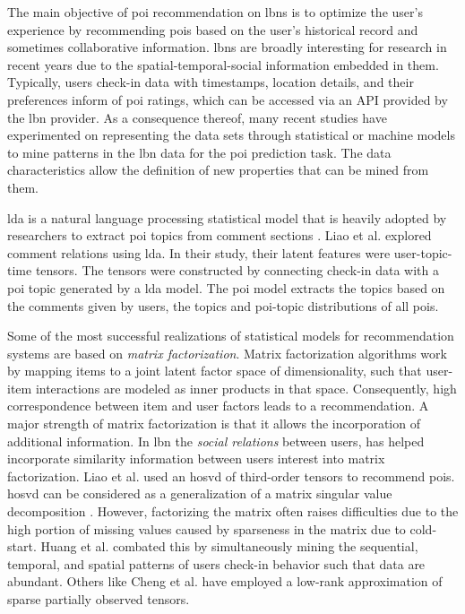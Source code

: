 The main objective of \gls{poi} recommendation on \glspl{lbn} is to optimize the user's experience by recommending \glspl{poi} based on the user's historical record and sometimes collaborative information. \Glspl{lbn} are broadly interesting for research in recent years due to the spatial-temporal-social information embedded in them\parencite{Cheng2011ExploringServices}. Typically, users check-in data with timestamps, location details, and their preferences inform of \gls{poi} ratings, which can be accessed via an API provided by the \gls{lbn} provider. As a consequence thereof, many recent studies have experimented on representing the data sets through statistical or machine models to mine patterns in the \gls{lbn} data for the \gls{poi} prediction task. The data characteristics allow the definition of new properties that can be mined from them.

\Gls{lda} is a natural language processing statistical model that is heavily adopted by researchers to extract \gls{poi} topics from comment sections \parencite{Liao2018POIFactorization, Huang2020Multi-modalNetworks}. Liao et al.\parencite{Liao2018POIFactorization} explored comment relations using \gls{lda}. In their study, their latent features were user-topic-time \glspl{tensor}. The \glspl{tensor} were constructed by connecting check-in data with a \gls{poi} topic generated by a \gls{lda} model. The \gls{poi} model extracts the topics based on the comments given by users, the topics and \gls{poi}-topic distributions of all \glspl{poi}. 

Some of the most successful realizations of statistical models for recommendation systems are based on \textit{matrix factorization}\parencite{Cheng2013WhereRecommendation, Cheng2012FusedNetworks, Chen2018PrivacyFactorization, Gao2013ExploringNetworks, Lian2015Content-AwareData}. Matrix factorization\parencite{Koren2009MatrixSystems} algorithms work by mapping items to a joint latent factor space of dimensionality, such that user-item interactions are modeled as inner products in that space. Consequently, high correspondence between item and user factors leads to a recommendation. A major strength of matrix factorization is that it allows the incorporation of additional information. In \gls{lbn} the \textit{social relations} between users, has helped incorporate similarity information between users interest into matrix factorization\parencite{Cheng2013WhereRecommendation, Liao2018POIFactorization, Huang2020Multi-modalNetworks}. Liao et al.\parencite{Liao2018POIFactorization} used an \gls{hosvd} of third-order \glspl{tensor} to recommend \glspl{poi}. \Gls{hosvd} can be considered as a generalization of a matrix singular value decomposition \parencite{Vandewalle1990SingularProcessing}. However, factorizing the matrix often raises difficulties due to the high portion of missing values caused by sparseness in the matrix due to cold-start. Huang et al.\parencite{Huang2020Multi-modalNetworks} combated this by simultaneously mining the sequential, temporal, and spatial patterns of users check-in behavior such that data are abundant. Others like Cheng et al.\parencite{Cheng2013WhereRecommendation} have employed a low-rank approximation of sparse partially observed \glspl{tensor}.

